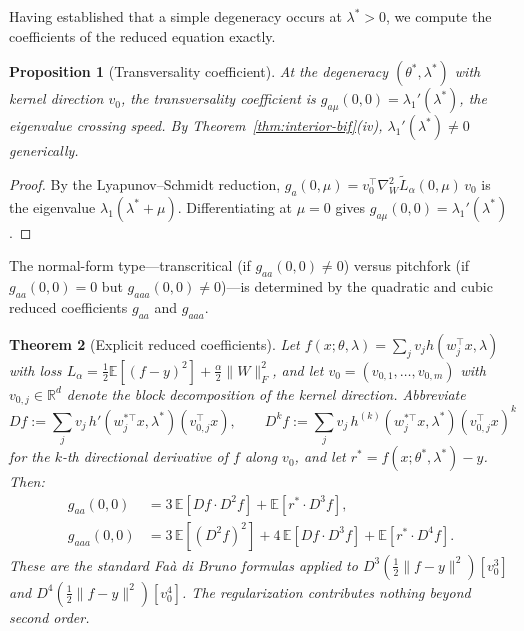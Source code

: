 \documentclass[11pt, reqno]{amsart}
\theoremstyle{plain}
\newtheorem{theorem}{Theorem}[section]
\newtheorem{proposition}[theorem]{Proposition}
\theoremstyle{definition}
\theoremstyle{remark}
\begin{document}
Having established that a simple degeneracy occurs at $\lambda^*>0$, we compute the coefficients of the reduced equation exactly.

\begin{proposition}[Transversality coefficient]\label{prop:transversality}
At the degeneracy $(\theta^*,\lambda^*)$ with kernel direction $v_0$, the transversality coefficient is $g_{a\mu}(0,0)=\lambda_1'(\lambda^*)$, the eigenvalue crossing speed.  By Theorem~\ref{thm:interior-bif}(iv), $\lambda_1'(\lambda^*)\neq 0$ generically.
\end{proposition}

\begin{proof}
By the Lyapunov--Schmidt reduction, $g_a(0,\mu)=v_0^\top \nabla_W^2\widetilde L_\alpha(0,\mu)\,v_0$ is the eigenvalue $\lambda_1(\lambda^*+\mu)$.  Differentiating at $\mu=0$ gives $g_{a\mu}(0,0)=\lambda_1'(\lambda^*)$.
\end{proof}

The normal-form type---transcritical (if $g_{aa}(0,0)\neq 0$) versus pitchfork (if $g_{aa}(0,0)=0$ but $g_{aaa}(0,0)\neq 0$)---is determined by the quadratic and cubic reduced coefficients $g_{aa}$ and $g_{aaa}$.

\begin{theorem}[Explicit reduced coefficients]\label{thm:near-pitchfork}
Let $f(x;\theta,\lambda)=\sum_j v_j h(w_j^\top x,\lambda)$ with loss $L_\alpha=\tfrac12\mathbb E[(f-y)^2]+\tfrac\alpha2\|W\|_F^2$, and let $v_0=(v_{0,1},\ldots,v_{0,m})$ with $v_{0,j}\in\mathbb R^d$ denote the block decomposition of the kernel direction.  Abbreviate
\begin{equation}
  Df := \sum_j v_j\, h'(w_j^{*\top}x,\lambda^*)(v_{0,j}^\top x),
  \qquad
  D^kf := \sum_j v_j\, h^{(k)}(w_j^{*\top}x,\lambda^*)(v_{0,j}^\top x)^k
\end{equation}
for the $k$-th directional derivative of $f$ along $v_0$, and let $r^*=f(x;\theta^*,\lambda^*)-y$.  Then:
\begin{align}
  g_{aa}(0,0)  &= 3\,\mathbb E[Df\cdot D^2f] + \mathbb E[r^*\cdot D^3f], \label{eq:gaa-exact}\\
  g_{aaa}(0,0) &= 3\,\mathbb E[(D^2f)^2] + 4\,\mathbb E[Df\cdot D^3f] + \mathbb E[r^*\cdot D^4f]. \label{eq:gaaa-exact}
\end{align}
These are the standard Fa\`a di Bruno formulas applied to $D^3(\tfrac12\|f-y\|^2)[v_0^3]$ and $D^4(\tfrac12\|f-y\|^2)[v_0^4]$.  The regularization contributes nothing beyond second order.
\end{theorem}
\end{document}

